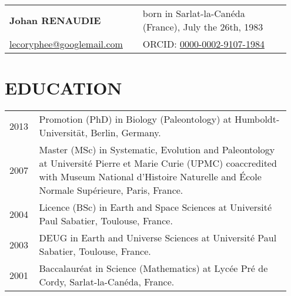 \documentclass[11pt, a4paper]{article}
\begin{document}
\begin{longtable}{@{}p{0.45\linewidth} >{\raggedleft\arraybackslash}p{0.5\linewidth}@{}}
{\bfseries \Large Johan RENAUDIE} & born in Sarlat-la-Can\'{e}da (France), July the 26th, 1983 \\
\href{mailto:lecoryphee@googlemail.com}{lecoryphee@googlemail.com} & ORCID: \href{http://orcid.org/0000-0002-9107-1984}{0000-0002-9107-1984}\\
\hline
\end{longtable}

\section{EDUCATION}
\begin{longtable}{@{}p{0.1\linewidth} >{\small}P{0.85\linewidth}@{}}
2013 & Promotion (PhD) in Biology (Paleontology) at Humboldt-Universit\"{a}t, Berlin, Germany.\\
2007 & Master (MSc) in Systematic, Evolution and Paleontology at Universit\'{e} Pierre et Marie Curie (UPMC) coaccredited with Museum National d'Histoire Naturelle and \'{E}cole Normale Sup\'{e}rieure, Paris, France.\\
2004 & Licence (BSc) in Earth and Space Sciences at Universit\'{e} Paul Sabatier, Toulouse, France.\\
2003 & DEUG in Earth and Universe Sciences at Universit\'{e} Paul Sabatier, Toulouse, France.\\
2001 & Baccalaur\'{e}at in Science (Mathematics) at Lyc\'{e}e Pr\'{e} de Cordy, Sarlat-la-Can\'{e}da, France.\\
\end{longtable}
\end{document}
